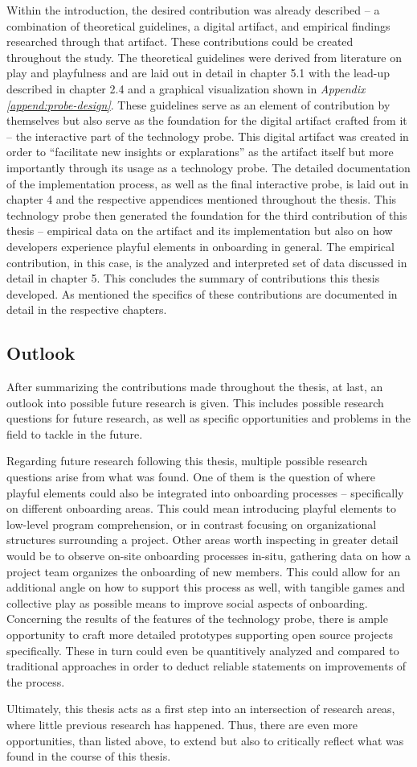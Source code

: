 Within the introduction, the desired contribution was already described -- a combination of theoretical guidelines, a digital artifact, and empirical findings researched through that artifact. These contributions could be created throughout the study. The theoretical guidelines were derived from literature on play and playfulness and are laid out in detail in chapter 5.1 with the lead-up described in chapter 2.4 and a graphical visualization shown in \textit{Appendix \ref{append:probe-design}}. These guidelines serve as an element of contribution by themselves but also serve as the foundation for the digital artifact crafted from it -- the interactive part of the technology probe. This digital artifact was created in order to \enquote{facilitate new insights or explarations} \cite[p. 2]{wobbrock2016research} as the artifact itself but more importantly through its usage as a technology probe. The detailed documentation of the implementation process, as well as the final interactive probe, is laid out in chapter 4 and the respective appendices mentioned throughout the thesis. This technology probe then generated the foundation for the third contribution of this thesis -- empirical data on the artifact and its implementation but also on how developers experience playful elements in onboarding in general. The empirical contribution, in this case, is the analyzed and interpreted set of data discussed in detail in chapter 5. This concludes the summary of contributions this thesis developed. As mentioned the specifics of these contributions are documented in detail in the respective chapters.

\subsection{Outlook}

After summarizing the contributions made throughout the thesis, at last, an outlook into possible future research is given. This includes possible research questions for future research, as well as specific opportunities and problems in the field to tackle in the future.

Regarding future research following this thesis, multiple possible research questions arise from what was found. One of them is the question of where playful elements could also be integrated into onboarding processes -- specifically on different onboarding areas. This could mean introducing playful elements to low-level program comprehension, or in contrast focusing on organizational structures surrounding a project. Other areas worth inspecting in greater detail would be to observe on-site onboarding processes in-situ, gathering data on how a project team organizes the onboarding of new members. This could allow for an additional angle on how to support this process as well, with tangible games and collective play as possible means to improve social aspects of onboarding. Concerning the results of the features of the technology probe, there is ample opportunity to craft more detailed prototypes supporting open source projects specifically. These in turn could even be quantitively analyzed and compared to traditional approaches in order to deduct reliable statements on improvements of the process.

Ultimately, this thesis acts as a first step into an intersection of research areas, where little previous research has happened. Thus, there are even more opportunities, than listed above, to extend but also to critically reflect what was found in the course of this thesis.